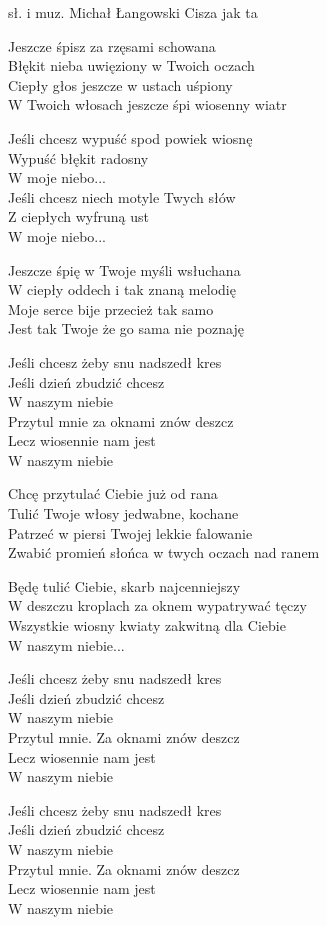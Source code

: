 {sł. i muz. Michał Łangowski}
{Cisza jak ta}
\begin{text}
    \hfill\break
Jeszcze śpisz za rzęsami schowana \\
Błękit nieba uwięziony w Twoich oczach \\
Ciepły głos jeszcze w ustach uśpiony \\
W Twoich włosach jeszcze śpi wiosenny wiatr

\vin Jeśli chcesz wypuść spod powiek wiosnę \\
\vin Wypuść błękit radosny \\
\vin W moje niebo... \\
\vin Jeśli chcesz niech motyle Twych słów \\
\vin Z ciepłych wyfruną ust \\
\vin W moje niebo...

    \hfill\break
Jeszcze śpię w Twoje myśli wsłuchana \\
W ciepły oddech i tak znaną melodię \\
Moje serce bije przecież tak samo \\
Jest tak Twoje że go sama nie poznaję

\vin Jeśli chcesz żeby snu nadszedł kres \\
\vin Jeśli dzień zbudzić chcesz \\
\vin W naszym niebie \\
\vin Przytul mnie za oknami znów deszcz \\
\vin Lecz wiosennie nam jest \\
\vin W naszym niebie

    \hfill\break
Chcę przytulać Ciebie już od rana \\
Tulić Twoje włosy jedwabne, kochane \\
Patrzeć w piersi Twojej lekkie falowanie \\
Zwabić promień słońca w twych oczach nad ranem

Będę tulić Ciebie, skarb najcenniejszy \\
W deszczu kroplach za oknem wypatrywać tęczy \\
Wszystkie wiosny kwiaty zakwitną dla Ciebie \\
W naszym niebie...

\vin Jeśli chcesz żeby snu nadszedł kres \\
\vin Jeśli dzień zbudzić chcesz \\
\vin W naszym niebie \\
\vin Przytul mnie. Za oknami znów deszcz \\
\vin Lecz wiosennie nam jest \\
\vin W naszym niebie

\vin Jeśli chcesz żeby snu nadszedł kres \\
\vin Jeśli dzień zbudzić chcesz \\
\vin W naszym niebie \\
\vin Przytul mnie. Za oknami znów deszcz \\
\vin Lecz wiosennie nam jest \\
\vin W naszym niebie
\end{text}

